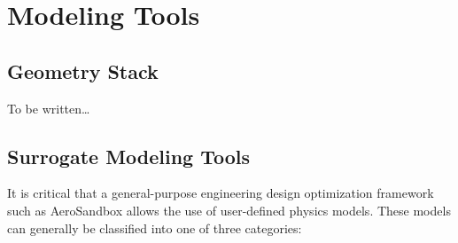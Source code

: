 \chapter{Modeling Tools}
\label{chapter:modeling}


\section{Geometry Stack}

To be written\dots %


\section{Surrogate Modeling Tools}
\label{sect:surrogate}

It is critical that a general-purpose engineering design optimization framework such as AeroSandbox allows the use of user-defined physics models. These models can generally be classified into one of three categories:

